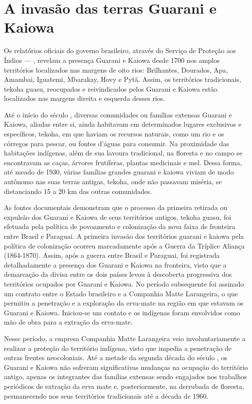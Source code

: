\section{A invasão das terras Guarani e Kaiowa}

Os relatórios oficiais do governo brasileiro, através do Serviço de
Proteção aos Índios — , revelam a presença Guarani e Kaiowa desde
1700 nos amplos territórios localizados nas margens de oito rios:
Brilhantes, Dourados, Apa, Amambai, Iguatemi, Mbarakay, Hovy e Pytã.
Assim, os territórios tradicionais, tekoha guasu, reocupados e
reivindicados pelos Guarani e Kaiowa estão localizados nas margens
direita e esquerda desses rios.

Até o início do século , diversas comunidades ou famílias extensas
Guarani e Kaiowa, aliadas entre si, ainda habitavam em determinados
lugares exclusivos e específicos, tekoha, em que haviam os recursos
naturais, como um rio e os córregos para pescar, ou fontes d’águas para
consumir. Na proximidade das habitações indígenas, além de sua lavoura
tradicional, na floresta e no campo se encontravam as caças, árvores
frutíferas, plantas medicinais e mel. Dessa forma, até meado de 1930,
várias famílias grandes guarani e kaiowa viviam de modo autônomo nas
suas terras antigas, tekoha, onde não passavam miséria, se distanciando
15 a 20 km das outras comunidades.

As fontes documentais demonstram que o processo da primeira retirada ou
expulsão dos Guarani e Kaiowa de seus territórios antigos, tekoha
guasu, foi efetuada pela política de povoamento e colonização da nova
faixa de fronteira entre Brasil e Paraguai. A primeira invasão dos
territórios guarani e kaiowa pela política de colonização ocorreu
marcadamente após a Guerra da Tríplice Aliança (1864-1870). Assim, após
a guerra entre Brasil e Paraguai, foi registrada detalhadamente a
presença dos Guarani e Kaiowa na fronteira, visto que a demarcação da
divisa entre os dois países levou à descoberta progressiva dos
territórios ocupados por Guarani e Kaiowa. No período subsequente foi
assinado um contrato entre o Estado brasileiro e a Companhia Matte
Larangeira, o que permitiu a penetração e a exploração da erva-mate na
região em que estavam os Guarani e Kaiowa. Iniciou-se um contato e os
indígenas foram envolvidos como mão de obra para a extração da
erva-mate.

Nesse período, a empresa Companhia Matte Larangeira veio
involuntariamente a realizar a proteção do território indígena, visto
que impedia a penetração de outras frentes neocoloniais. Até a metade
da segunda década do século , os Guarani e Kaiowa não sofreram
significativas mudanças na ocupação do território antigo, apenas os
integrantes das famílias extensas sendo engajados nos trabalhos
periódicos de extração da erva mate e, posteriormente, na derrubada de
floresta, permanecendo nos seus territórios tradicionais até a década
de 1960.

